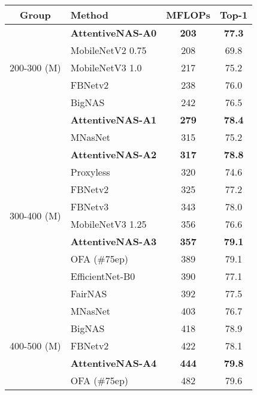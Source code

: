 \documentclass[final]{cvpr}
\theoremstyle{definition}
\begin{document}
\begin{table}[ht]
    \centering
    \setlength{\tabcolsep}{1pt}
    \begin{tabular}{clcc}
        \hline 
        Group & Method & MFLOPs & Top-1  \\
        \hline 
        \multirow{5}{6em}{200-300 (M) } 
        & \textbf{AttentiveNAS-A0}  & \textbf{203} & \textbf{77.3} \\
        & MobileNetV2 {\scriptsize 0.75}~\cite{sandler2018mobilenetv2} & 208 & 69.8 \\
        & MobileNetV3 {\scriptsize 1.0}~\cite{howard2019searching} & 217 & 75.2 \\
        & FBNetv2~\cite{wan2020fbnetv2} & 238 & 76.0 \\
        & BigNAS~\cite{yu2020bignas} & 242 & 76.5 \\
        & \textbf{AttentiveNAS-A1}   & \textbf{279} & \textbf{78.4} \\ \hline 
         \multirow{10}{6em}{300-400 (M) }
         & MNasNet~\cite{tan2019mnasnet} & 315 & 75.2 \\
        & \textbf{AttentiveNAS-A2} & \textbf{317} & \textbf{78.8}\\
        & Proxyless~\cite{cai2018proxylessnas} & 320 & 74.6 \\
        & FBNetv2~\cite{wan2020fbnetv2} & 325 & 77.2 \\ 
        & FBNetv3~\cite{dai2020fbnetv3} & 343 & 78.0 \\
        & MobileNetV3 {\scriptsize 1.25}~\cite{howard2019searching} & 356 & 76.6 \\
        & \textbf{AttentiveNAS-A3} & \textbf{357} & \textbf{79.1} \\  
        & OFA (\#75ep)~\cite{cai2019once} & 389 & 79.1 \\
        & EfficientNet-B0~\cite{tan2019efficientnet} & 390 & 77.1 \\ 
        & FairNAS~\cite{chu2019fairnas} & 392 & 77.5 \\ \hline 
        \multirow{7}{6em}{400-500 (M) }
        & MNasNet~\cite{tan2019mnasnet} & 403 & 76.7 \\
& BigNAS~\cite{yu2020bignas} & 418  &  78.9 \\
        & FBNetv2~\cite{wan2020fbnetv2} &  422 & 78.1\\ 
        & \textbf{AttentiveNAS-A4}  & \textbf{444} & \textbf{79.8} \\
        & OFA (\#75ep)~\cite{cai2019once} & 482 & 79.6 \\

\end{tabular}
\end{table}
\end{document}

